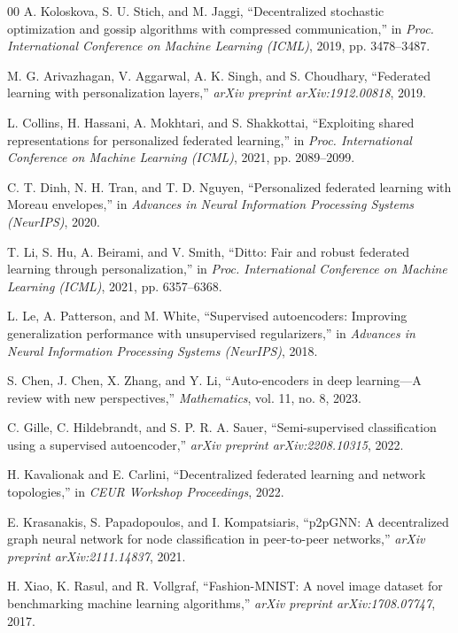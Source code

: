 \documentclass[conference]{IEEEtran}
\begin{document}
\begin{thebibliography}{00}
A. Koloskova, S. U. Stich, and M. Jaggi, ``Decentralized stochastic optimization and gossip algorithms with compressed communication,'' in \emph{Proc. International Conference on Machine Learning (ICML)}, 2019, pp. 3478--3487.

M. G. Arivazhagan, V. Aggarwal, A. K. Singh, and S. Choudhary, ``Federated learning with personalization layers,'' \emph{arXiv preprint arXiv:1912.00818}, 2019.

L. Collins, H. Hassani, A. Mokhtari, and S. Shakkottai, ``Exploiting shared representations for personalized federated learning,'' in \emph{Proc. International Conference on Machine Learning (ICML)}, 2021, pp. 2089--2099.

C. T. Dinh, N. H. Tran, and T. D. Nguyen, ``Personalized federated learning with Moreau envelopes,'' in \emph{Advances in Neural Information Processing Systems (NeurIPS)}, 2020.

T. Li, S. Hu, A. Beirami, and V. Smith, ``Ditto: Fair and robust federated learning through personalization,'' in \emph{Proc. International Conference on Machine Learning (ICML)}, 2021, pp. 6357--6368.

L. Le, A. Patterson, and M. White, ``Supervised autoencoders: Improving generalization performance with unsupervised regularizers,'' in \emph{Advances in Neural Information Processing Systems (NeurIPS)}, 2018.

S. Chen, J. Chen, X. Zhang, and Y. Li, ``Auto-encoders in deep learning---A review with new perspectives,'' \emph{Mathematics}, vol. 11, no. 8, 2023.

C. Gille, C. Hildebrandt, and S. P. R. A. Sauer, ``Semi-supervised classification using a supervised autoencoder,'' \emph{arXiv preprint arXiv:2208.10315}, 2022.

H. Kavalionak and E. Carlini, ``Decentralized federated learning and network topologies,'' in \emph{CEUR Workshop Proceedings}, 2022.

E. Krasanakis, S. Papadopoulos, and I. Kompatsiaris, ``p2pGNN: A decentralized graph neural network for node classification in peer-to-peer networks,'' \emph{arXiv preprint arXiv:2111.14837}, 2021.

H. Xiao, K. Rasul, and R. Vollgraf, ``Fashion-MNIST: A novel image dataset for benchmarking machine learning algorithms,'' \emph{arXiv preprint arXiv:1708.07747}, 2017.

\end{thebibliography}



\balance
\end{document}

